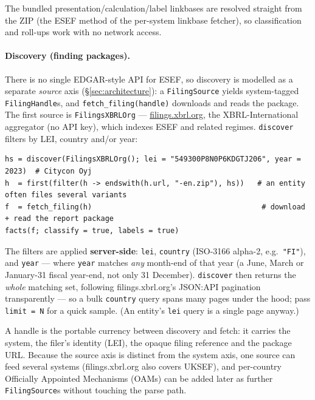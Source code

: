\documentclass[11pt,a4paper]{report}
\begin{document}
The bundled presentation/calculation/label linkbases are resolved straight from the ZIP (the ESEF
method of the per-system linkbase fetcher), so classification and roll-ups work with no network access.

\paragraph{Discovery (finding packages).} There is no single EDGAR-style API for ESEF, so discovery
is modelled as a separate \emph{source} axis (\S\ref{sec:architecture}): a \texttt{FilingSource}
yields system-tagged \texttt{FilingHandle}s, and \texttt{fetch\_filing(handle)} downloads and reads
the package. The first source is \texttt{FilingsXBRLOrg} ---
\href{https://filings.xbrl.org}{filings.xbrl.org}, the XBRL-International aggregator (no API key),
which indexes ESEF and related regimes. \texttt{discover} filters by LEI, country and/or year:

\begin{lstlisting}
hs = discover(FilingsXBRLOrg(); lei = "549300P8N0P6KDGTJ206", year = 2023)  # Citycon Oyj
h  = first(filter(h -> endswith(h.url, "-en.zip"), hs))   # an entity often files several variants
f  = fetch_filing(h)                                       # download + read the report package
facts(f; classify = true, labels = true)
\end{lstlisting}

\noindent The filters are applied \textbf{server-side}: \texttt{lei}, \texttt{country} (ISO-3166 alpha-2,
e.g.\ \texttt{"FI"}), and \texttt{year} --- where \texttt{year} matches \emph{any} month-end of that year (a
June, March or January-31 fiscal year-end, not only 31 December). \texttt{discover} then returns the
\emph{whole} matching set, following filings.xbrl.org's JSON:API pagination transparently --- so a bulk
\texttt{country} query spans many pages under the hood; pass \texttt{limit = N} for a quick sample. (An
entity's \texttt{lei} query is a single page anyway.)

\noindent A handle is the portable currency between discovery and fetch: it carries the system, the
filer's identity (LEI), the opaque filing reference and the package URL. Because the source axis is
distinct from the system axis, one source can feed several systems (filings.xbrl.org also covers
UKSEF), and per-country Officially Appointed Mechanisms (OAMs) can be added later as further
\texttt{FilingSource}s without touching the parse path.
\end{document}
